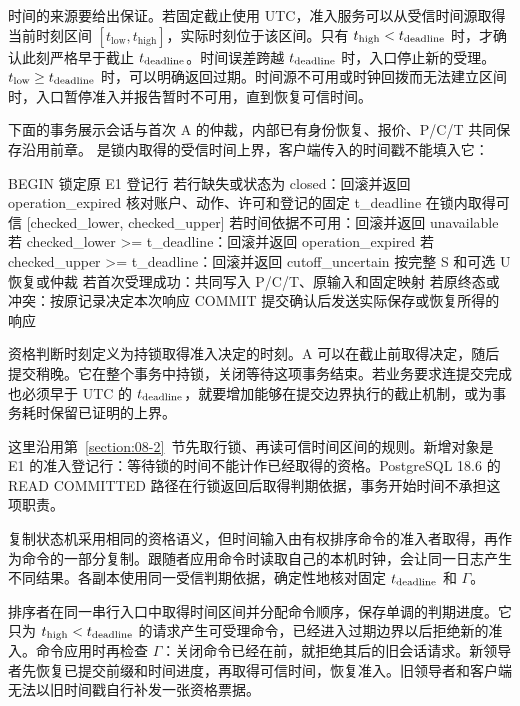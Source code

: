 时间的来源要给出保证。若固定截止使用 UTC，准入服务可以从受信时间源取得当前时刻区间 $[t_{\mathrm{low}},t_{\mathrm{high}}]$，实际时刻位于该区间。只有 $t_{\mathrm{high}}<t_{\rm deadline}$ 时，才确认此刻严格早于截止 $t_{\rm deadline}$。时间误差跨越 $t_{\rm deadline}$ 时，入口停止新的受理。$t_{\mathrm{low}}\ge t_{\rm deadline}$ 时，可以明确返回过期。时间源不可用或时钟回拨而无法建立区间时，入口暂停准入并报告暂时不可用，直到恢复可信时间。


下面的事务展示会话与首次 A 的仲裁，内部已有身份恢复、报价、P/C/T 共同保存沿用前章。 是锁内取得的受信时间上界，客户端传入的时间戳不能填入它：

\begin{BookCode}
BEGIN
锁定原 E1 登记行
若行缺失或状态为 closed：回滚并返回 operation_expired
核对账户、动作、许可和登记的固定 t_deadline
在锁内取得可信 [checked_lower, checked_upper]
若时间依据不可用：回滚并返回 unavailable
若 checked_lower >= t_deadline：回滚并返回 operation_expired
若 checked_upper >= t_deadline：回滚并返回 cutoff_uncertain
按完整 S 和可选 U 恢复或仲裁
若首次受理成功：共同写入 P/C/T、原输入和固定映射
若原终态或冲突：按原记录决定本次响应
COMMIT
提交确认后发送实际保存或恢复所得的响应
\end{BookCode}

资格判断时刻定义为持锁取得准入决定的时刻。A 可以在截止前取得决定，随后提交稍晚。它在整个事务中持锁，关闭等待这项事务结束。若业务要求连提交完成也必须早于 UTC 的 $t_{\rm deadline}$，就要增加能够在提交边界执行的截止机制，或为事务耗时保留已证明的上界。

这里沿用第~\ref{section:08-2}~节先取行锁、再读可信时间区间的规则。新增对象是 E1 的准入登记行：等待锁的时间不能计作已经取得的资格。PostgreSQL 18.6 的 READ COMMITTED 路径在行锁返回后取得判期依据，事务开始时间不承担这项职责。


复制状态机采用相同的资格语义，但时间输入由有权排序命令的准入者取得，再作为命令的一部分复制。跟随者应用命令时读取自己的本机时钟，会让同一日志产生不同结果。各副本使用同一受信判期依据，确定性地核对固定 $t_{\rm deadline}$ 和 $\Gamma$。

排序者在同一串行入口中取得时间区间并分配命令顺序，保存单调的判期进度。它只为 $t_{\mathrm{high}}<t_{\rm deadline}$ 的请求产生可受理命令，已经进入过期边界以后拒绝新的准入。命令应用时再检查 $\Gamma$：关闭命令已经在前，就拒绝其后的旧会话请求。新领导者先恢复已提交前缀和时间进度，再取得可信时间，恢复准入。旧领导者和客户端无法以旧时间戳自行补发一张资格票据。

